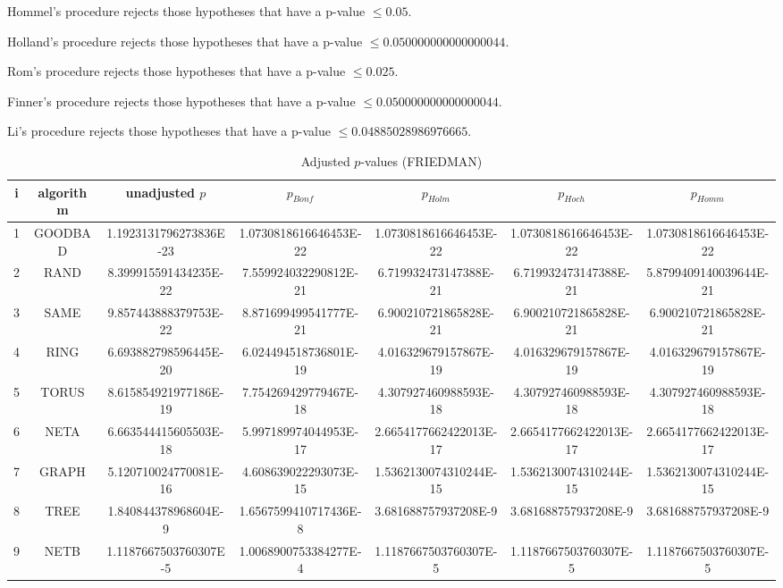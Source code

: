 \documentclass[a4paper,10pt]{article}
\begin{document}
\begin{landscape}
Hommel's procedure rejects those hypotheses that have a p-value $\le0.05$.


Holland's procedure rejects those hypotheses that have a p-value $\le0.050000000000000044$.


Rom's procedure rejects those hypotheses that have a p-value $\le0.025$.


Finner's procedure rejects those hypotheses that have a p-value $\le0.050000000000000044$.


Li's procedure rejects those hypotheses that have a p-value $\le0.04885028986976665$.



\newpage

\begin{table}[!htp]
\centering\scriptsize
\caption{Adjusted $p$-values (FRIEDMAN)}
\begin{tabular}{ccccccc}
i&algorithm&unadjusted $p$&$p_{Bonf}$&$p_{Holm}$&$p_{Hoch}$&$p_{Homm}$\\
\hline
1& GOODBAD&1.1923131796273836E-23&1.0730818616646453E-22&1.0730818616646453E-22&1.0730818616646453E-22&1.0730818616646453E-22\\
2& RAND&8.399915591434235E-22&7.559924032290812E-21&6.719932473147388E-21&6.719932473147388E-21&5.8799409140039644E-21\\
3& SAME&9.857443888379753E-22&8.871699499541777E-21&6.900210721865828E-21&6.900210721865828E-21&6.900210721865828E-21\\
4& RING&6.693882798596445E-20&6.024494518736801E-19&4.016329679157867E-19&4.016329679157867E-19&4.016329679157867E-19\\
5& TORUS&8.615854921977186E-19&7.754269429779467E-18&4.307927460988593E-18&4.307927460988593E-18&4.307927460988593E-18\\
6& NETA&6.663544415605503E-18&5.997189974044953E-17&2.6654177662422013E-17&2.6654177662422013E-17&2.6654177662422013E-17\\
7& GRAPH&5.120710024770081E-16&4.608639022293073E-15&1.5362130074310244E-15&1.5362130074310244E-15&1.5362130074310244E-15\\
8& TREE&1.840844378968604E-9&1.6567599410717436E-8&3.681688757937208E-9&3.681688757937208E-9&3.681688757937208E-9\\
9& NETB&1.1187667503760307E-5&1.0068900753384277E-4&1.1187667503760307E-5&1.1187667503760307E-5&1.1187667503760307E-5\\
\hline
\end{tabular}
\end{table}


\end{landscape}
\end{document}
